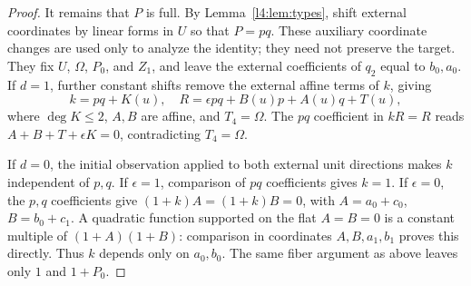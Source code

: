 \documentclass[11pt,a4paper]{article}
\theoremstyle{plain}
\theoremstyle{remark}
\begin{document}
\begin{proof}
It remains that $P$ is full. By Lemma~\ref{l4:lem:types}, shift external coordinates by linear forms in $U$ so that $P=pq$. These auxiliary coordinate changes are used only to analyze the identity; they need not preserve the target. They fix $U$, $\Omega$, $P_0$, and $Z_1$, and leave the external coefficients of $q_2$ equal to $b_0,a_0$. If $d=1$, further constant shifts remove the external affine terms of $k$, giving
\[
k=pq+K(u),\quad R=\epsilon pq+B(u)p+A(u)q+T(u),
\]
where $\deg K\le2$, $A,B$ are affine, and $T_4=\Omega$. The $pq$ coefficient in $kR=R$ reads $A+B+T+\epsilon K=0$, contradicting $T_4=\Omega$.

If $d=0$, the initial observation applied to both external unit directions makes $k$ independent of $p,q$. If $\epsilon=1$, comparison of $pq$ coefficients gives $k=1$. If $\epsilon=0$, the $p,q$ coefficients give $(1+k)A=(1+k)B=0$, with $A=a_0+c_0$, $B=b_0+c_1$. A quadratic function supported on the flat $A=B=0$ is a constant multiple of $(1+A)(1+B)$: comparison in coordinates $A,B,a_1,b_1$ proves this directly. Thus $k$ depends only on $a_0,b_0$. The same fiber argument as above leaves only $1$ and $1+P_0$.
\end{proof}
\end{document}
